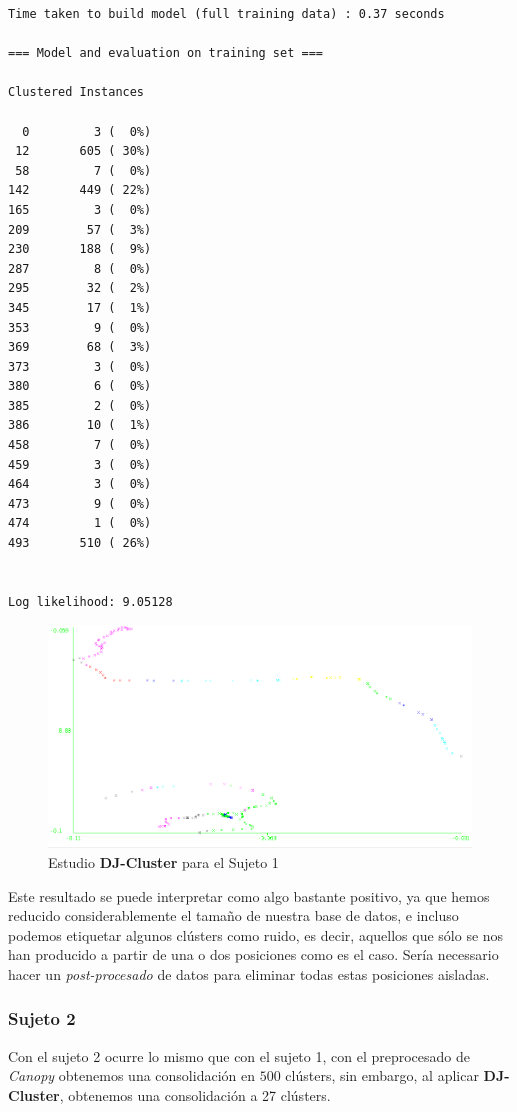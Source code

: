\documentclass[a4paper, 12pt]{article}
\begin{document}
\begin{verbatim}
Time taken to build model (full training data) : 0.37 seconds

=== Model and evaluation on training set ===

Clustered Instances

  0         3 (  0%)
 12       605 ( 30%)
 58         7 (  0%)
142       449 ( 22%)
165         3 (  0%)
209        57 (  3%)
230       188 (  9%)
287         8 (  0%)
295        32 (  2%)
345        17 (  1%)
353         9 (  0%)
369        68 (  3%)
373         3 (  0%)
380         6 (  0%)
385         2 (  0%)
386        10 (  1%)
458         7 (  0%)
459         3 (  0%)
464         3 (  0%)
473         9 (  0%)
474         1 (  0%)
493       510 ( 26%)


Log likelihood: 9.05128
\end{verbatim}


\begin{figure}[H]
	\includegraphics[scale=.5]{../comparativa/djClusterSujeto1.png}
	\caption{Estudio \textbf{DJ-Cluster} para el Sujeto 1}
\end{figure}

Este resultado se puede interpretar como algo bastante positivo, ya que hemos reducido considerablemente el tama\~no de nuestra base de datos, e incluso podemos etiquetar algunos cl\'usters como ruido, es decir, aquellos que s\'olo se nos han producido a partir de una o dos posiciones como es el caso. Ser\'ia necessario hacer un \textit{post-procesado} de datos para eliminar todas estas posiciones aisladas.

\subsubsection{Sujeto 2}

Con el sujeto 2 ocurre lo mismo que con el sujeto 1, con el preprocesado de \textit{Canopy} obtenemos una consolidaci\'on en $500$ cl\'usters, sin embargo, al aplicar \textbf{DJ-Cluster}, obtenemos una consolidaci\'on a 27 cl\'usters.\\
\end{document}
